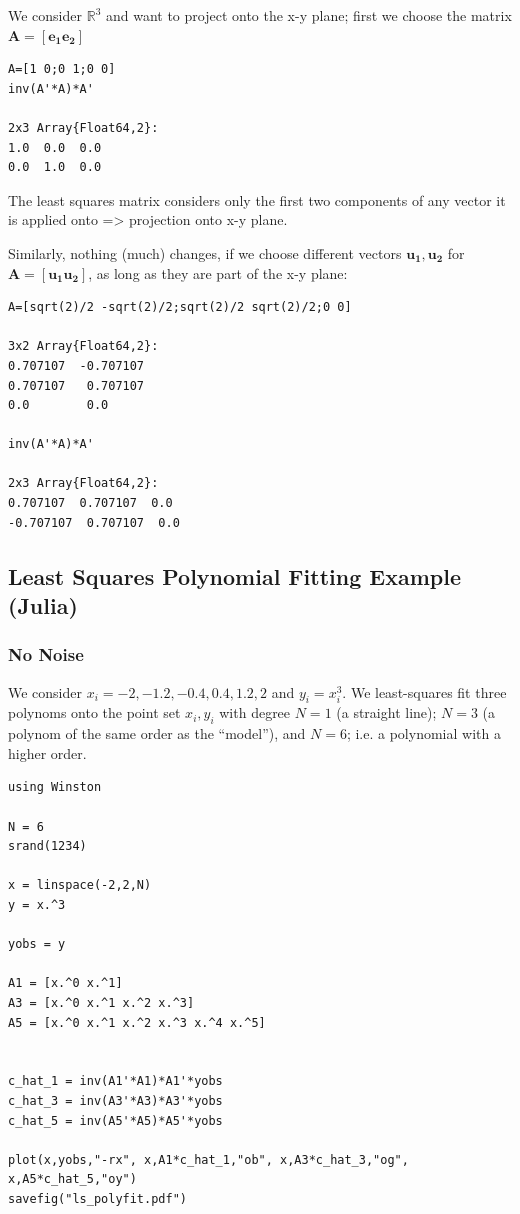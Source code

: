 We consider \(\mathbb{R}^3\) and want to project onto the x-y plane; first we choose the matrix \(\mathbf{A} = [\mathbf{e_1} \mathbf{e_2}]\)

\begin{verbatim}
A=[1 0;0 1;0 0]
inv(A'*A)*A'

2x3 Array{Float64,2}:
1.0  0.0  0.0
0.0  1.0  0.0
\end{verbatim}

The least squares matrix considers only the first two components of any vector it is applied onto =\textgreater{} projection onto x-y plane.

Similarly, nothing (much) changes, if we choose different vectors \(\mathbf{u_1}, \mathbf{u_2}\) for \(\mathbf{A} = [\mathbf{u_1} \mathbf{u_2}]\), as long as they are part of the x-y plane:

\begin{verbatim}
A=[sqrt(2)/2 -sqrt(2)/2;sqrt(2)/2 sqrt(2)/2;0 0]

3x2 Array{Float64,2}:
0.707107  -0.707107
0.707107   0.707107
0.0        0.0     

inv(A'*A)*A'

2x3 Array{Float64,2}:
0.707107  0.707107  0.0
-0.707107  0.707107  0.0
\end{verbatim}

\subsection{Least Squares Polynomial Fitting Example (Julia)}

\subsubsection{No Noise}

We consider \(x_i={-2,-1.2,-0.4,0.4,1.2,2}\) and $y_i=x_i^3$. We least-squares fit three polynoms onto the point set \({x_i,y_i}\) with degree \(N=1\) (a straight line); \(N=3\) (a polynom of the same order as the ``model''), and \(N=6\); i.e. a polynomial with a higher order.

\begin{verbatim}
using Winston

N = 6
srand(1234)

x = linspace(-2,2,N)
y = x.^3

yobs = y

A1 = [x.^0 x.^1]
A3 = [x.^0 x.^1 x.^2 x.^3]
A5 = [x.^0 x.^1 x.^2 x.^3 x.^4 x.^5]


c_hat_1 = inv(A1'*A1)*A1'*yobs
c_hat_3 = inv(A3'*A3)*A3'*yobs
c_hat_5 = inv(A5'*A5)*A5'*yobs

plot(x,yobs,"-rx", x,A1*c_hat_1,"ob", x,A3*c_hat_3,"og", x,A5*c_hat_5,"oy")
savefig("ls_polyfit.pdf")
\end{verbatim}

